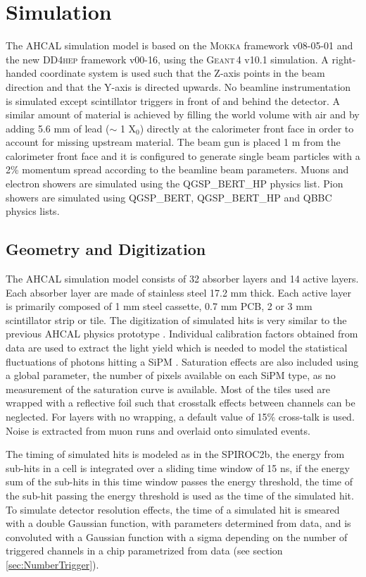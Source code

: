 \documentclass{JINST}
\newcommand\geant{\textsc{Geant\,4}\xspace}
\newcommand\mokka{\textsc{Mokka}\xspace}
\newcommand\ddhep{\textsc{DD4hep}\xspace}
\begin{document}
\section{Simulation}

The AHCAL simulation model is based on the \mokka \cite{MoradeFreitas:2002kj} framework v08-05-01 and the new \ddhep \cite{Frank:2014zya} framework v00-16, using the \geant v10.1 simulation. A right-handed coordinate system is used such that the Z-axis points in the beam direction and that the Y-axis is directed upwards. No beamline instrumentation is simulated except scintillator triggers in front of and behind the detector. A similar amount of material is achieved by filling the world volume with air and by adding 5.6 mm of lead ($\sim$ 1 X$_0$) directly at the calorimeter front face in order to account for missing upstream material. The beam gun is placed 1 m from the calorimeter front face and it is configured to generate single beam particles with a 2\% momentum spread according to the beamline beam parameters. Muons and electron showers are simulated using the QGSP\_BERT\_HP physics list. Pion showers are simulated using QGSP\_BERT, QGSP\_BERT\_HP and QBBC physics lists.

\subsection{Geometry and Digitization}
\label{sec:GeoDigi}

The AHCAL simulation model consists of 32 absorber layers and 14 active layers. Each absorber layer are made of stainless steel 17.2 mm thick. Each active layer is primarily composed of 1 mm steel cassette, 0.7 mm PCB, 2 or 3 mm scintillator strip or tile. The digitization of simulated hits is very similar to the previous AHCAL physics prototype \cite{1748-0221-5-05-P05004}. Individual calibration factors obtained from data are used to extract the light yield which is needed to model the statistical fluctuations of photons hitting a SiPM \cite{Hartbrich:2016bbz}. Saturation effects are also included using a global parameter, the number of pixels available on each SiPM type, as no measurement of the saturation curve is available. Most of the tiles used are wrapped with a reflective foil such that crosstalk effects between channels can be neglected. For layers with no wrapping, a default value of 15\% cross-talk is used. Noise is extracted from muon runs and overlaid onto simulated events.

The timing of simulated hits is modeled as in the SPIROC2b, the energy from sub-hits in a cell is integrated over a sliding time window of 15 ns, if the energy sum of the sub-hits in this time window passes the energy threshold, the time of the sub-hit passing the energy threshold is used as the time of the simulated hit. To simulate detector resolution effects, the time of a simulated hit is smeared with a double Gaussian function, with parameters determined from data, and is convoluted with a Gaussian function with a sigma depending on the number of triggered channels in a chip parametrized from data (see section \ref{sec:NumberTrigger}).
\end{document}
